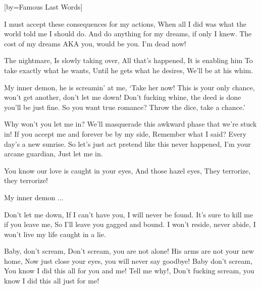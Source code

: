  

[by=Famous Last Words]


\beginverse
I must accept these consequences for my actions,
When all I did was what the world told me I should do.
And do anything for my dreams, if only I knew.
The cost of my dreams AKA you, would be you.
I'm dead now!
\endverse

\beginchorus
The nightmare,   \brk   Is slowly taking over,
All that's happened,   \brk   It is enabling him
To take exactly what he wants,   \brk   Until he gets what he desires, \brk  We'll be at his whim.
\endchorus

\beginchorus
My inner demon, he is screamin' at me, `Take her now!
This is your only chance, won't get another, don't let me down!
Don't fucking whine, the deed is done you'll be just fine.
So you want true romance? Throw the dice, take a chance.'
\endchorus

\beginverse
Why won't you let me in? 
We'll masquerade this awkward phase that we're stuck in!
If you accept me and forever be by my side,
Remember what I said? Every day's a new sunrise.
So let's just act pretend like this never happened,
I'm your arcane guardian, \brk  Just let me in.
\endverse

\beginchorus
You know our love is caught in your eyes, \brk  And those hazel eyes,  \brk  They terrorize, they terrorize!
\endchorus

\beginchorus
My inner demon ...
\endchorus

\beginchorus
Don't let me down,   \brk   If I can't have you, I will never be found.
It's sure to kill me if you leave me,  \brk  So I'll leave you gagged and bound.
I won't reside, never abide, \brk  I won't live my life caught in a lie.
\endchorus

\beginverse
Baby, don't scream, \brk  Don't scream, you are not alone!
His arms are not your new home, \brk  Now just close your eyes, you will never say goodbye!
Baby don't scream, \brk  You know I did this all for you and me!
Tell me why!, \brk  Don't fucking scream, you know I did this all just for me!
\endverse

